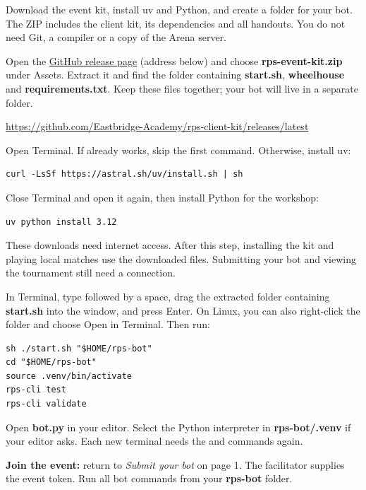 
\begin{context}
Download the event kit, install uv and Python, and create a folder for your bot.
The ZIP includes the client kit, its dependencies and all handouts. You do not
need Git, a compiler or a copy of the Arena server.
\end{context}

Open the \href{https://github.com/Eastbridge-Academy/rps-client-kit/releases/latest}{GitHub release page}
(address below) and choose \textbf{rps-event-kit.zip} under Assets. Extract it
and find the folder containing \textbf{start.sh}, \textbf{wheelhouse} and
\textbf{requirements.txt}. Keep these files together; your bot will live in a
separate folder.

{\small\url{https://github.com/Eastbridge-Academy/rps-client-kit/releases/latest}\par}

Open Terminal. If  already works, skip the first command.
Otherwise, install uv:

\begin{lstlisting}[style=shell]
curl -LsSf https://astral.sh/uv/install.sh | sh
\end{lstlisting}

Close Terminal and open it again, then install Python for the workshop:

\begin{lstlisting}[style=shell]
uv python install 3.12
\end{lstlisting}

These downloads need internet access. After this step, installing the kit and
playing local matches use the downloaded files. Submitting your bot and viewing
the tournament still need a connection.

In Terminal, type  followed by a space, drag the extracted folder
containing \textbf{start.sh} into the window, and press Enter. On Linux, you can
also right-click the folder and choose Open in Terminal. Then run:

\begin{lstlisting}[style=shell]
sh ./start.sh "$HOME/rps-bot"
cd "$HOME/rps-bot"
source .venv/bin/activate
rps-cli test
rps-cli validate
\end{lstlisting}

Open \textbf{bot.py} in your editor. Select the Python interpreter in
\textbf{rps-bot/.venv} if your editor asks. Each new terminal needs the
 and  commands again.

\begin{checkpoint}
\textbf{Join the event:} return to \emph{Submit your bot} on page 1.
The facilitator supplies the event token. Run all bot commands from your
\textbf{rps-bot} folder.
\end{checkpoint}
